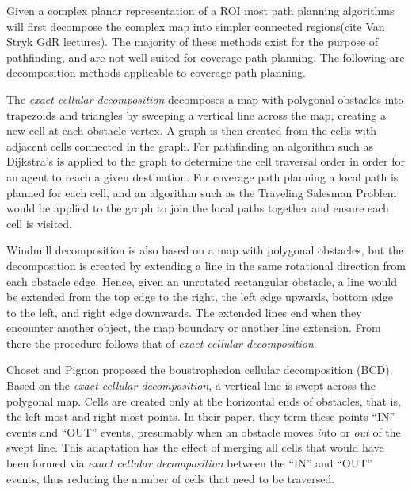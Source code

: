 Given a complex planar representation of a ROI most path planning algorithms will first decompose the complex map into simpler connected regions\cite{Cell_decomposition_survey}(cite Van Stryk GdR lectures).
The majority of these methods exist for the purpose of pathfinding, and are not well suited for coverage path planning.
The following are decomposition methods applicable to coverage path planning.

The \textit{exact cellular decomposition} decomposes a map with polygonal obstacles into trapezoids and triangles by sweeping a vertical line across the map, creating a new cell at each obstacle vertex\cite{Robot_motion_planning}.
A graph is then created from the cells with adjacent cells connected in the graph.
For pathfinding an algorithm such as Dijkstra's is applied to the graph to determine the cell traversal order in order for an agent to reach a given destination.
For coverage path planning a local path is planned for each cell, and an algorithm such as the Traveling Salesman Problem would be applied to the graph to join the local paths together and ensure each cell is visited.

Windmill decomposition is also based on a map with polygonal obstacles, but the decomposition is created by extending a line in the same rotational direction from each obstacle edge\cite{Windmill_decomp_for_free_pp}.
Hence, given an unrotated rectangular obstacle, a line would be extended from the top edge to the right, the left edge upwards, bottom edge to the left, and right edge downwards.
The extended lines end when they encounter another object, the map boundary or another line extension.
From there the procedure follows that of \textit{exact cellular decomposition}.

Choset and Pignon proposed the boustrophedon cellular decomposition (BCD)\cite{Bous_cellular_decomp}.
Based on the \textit{exact cellular decomposition}, a vertical line is swept across the polygonal map.
Cells are created only at the horizontal ends of obstacles, that is, the left-most and right-most points.
In their paper, they term these points ``IN'' events and ``OUT'' events, presumably when an obstacle moves \textit{in}to or \textit{out} of the swept line.
This adaptation has the effect of merging all cells that would have been formed via \textit{exact cellular decomposition} between the ``IN'' and ``OUT'' events, thus reducing the number of cells that need to be traversed.

